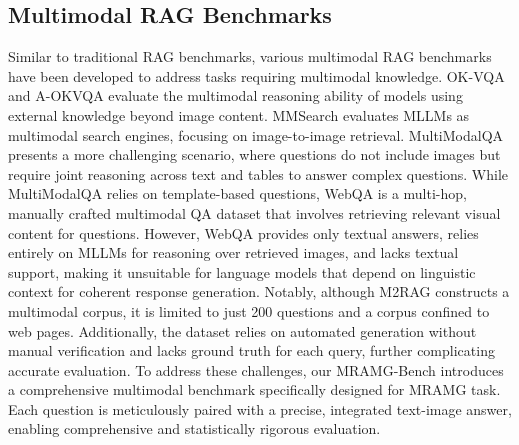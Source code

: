 \subsection{Multimodal RAG Benchmarks}
Similar to traditional RAG benchmarks, various multimodal RAG benchmarks \citep{marino2019ok,schwenk2022okvqa,jiang2024mmsearch,talmor2021multimodalqa,chang2022webqa,ma2024multi} have been developed to address tasks requiring multimodal knowledge. OK-VQA \citep{marino2019ok} and A-OKVQA \citep{schwenk2022okvqa} evaluate the multimodal reasoning ability of models using external knowledge beyond image content. MMSearch \citep{jiang2024mmsearch} evaluates MLLMs as multimodal search engines, focusing on image-to-image retrieval. MultiModalQA \citep{talmor2021multimodalqa} presents a more challenging scenario, where questions do not include images but require joint reasoning across text and tables to answer complex questions. While MultiModalQA relies on template-based questions, WebQA \citep{chang2022webqa} is a multi-hop, manually crafted multimodal QA dataset that involves retrieving relevant visual content for questions.
However, WebQA provides only textual answers, relies entirely on MLLMs for reasoning over retrieved images, and lacks textual support, making it unsuitable for language models that depend on linguistic context for coherent response generation. Notably, although M2RAG \citep{ma2024multi} constructs a multimodal corpus, it is limited to just 200 questions and a corpus confined to web pages. Additionally, the dataset relies on automated generation without manual verification and lacks ground truth for each query, further complicating accurate evaluation.
To address these challenges, our MRAMG-Bench introduces a comprehensive multimodal benchmark specifically designed for MRAMG task. Each question is meticulously paired with a precise, integrated text-image answer, enabling comprehensive and statistically rigorous evaluation.





